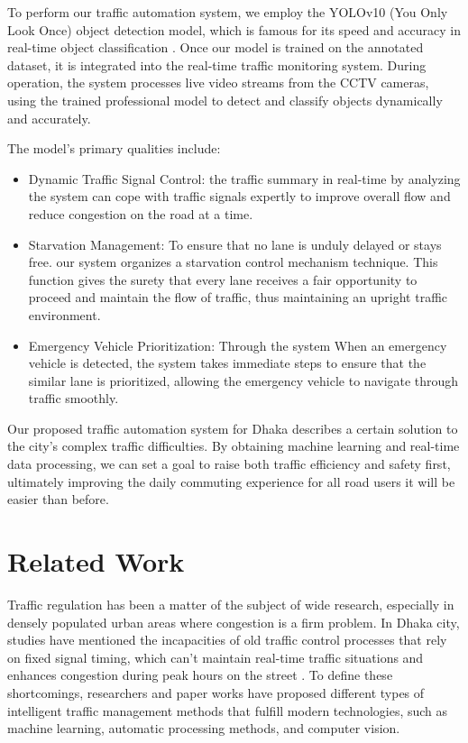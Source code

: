 \documentclass[usenatbib]{tjaa}
\begin{document}
To perform our traffic automation system, we employ the YOLOv10 (You Only Look Once) object detection model, which is famous for its speed and accuracy in real-time object classification \citep{clar:a4}. Once our model is trained on the annotated dataset, it is integrated into the real-time traffic monitoring system. During operation, the system processes live video streams from the CCTV cameras, using the trained professional model to detect and classify objects dynamically and accurately. 


The model's primary qualities include: 
\begin{itemize}
    \item Dynamic Traffic Signal Control: the traffic summary in real-time by analyzing the system can cope with traffic signals expertly to improve overall flow and reduce congestion on the road at a time.
    \item Starvation Management: To ensure that no lane is unduly delayed or stays free. our system organizes a starvation control mechanism technique. This function gives the surety that every lane receives a fair opportunity to proceed and maintain the flow of traffic, thus maintaining an upright traffic environment. 
    \item Emergency Vehicle Prioritization: Through the system When an emergency vehicle is detected, the system takes immediate steps to ensure that the similar lane is prioritized, allowing the emergency vehicle to navigate through traffic smoothly. 
\end{itemize}

 

Our proposed traffic automation system for Dhaka describes a certain solution to the city's complex traffic difficulties. By obtaining machine learning and real-time data processing, we can set a goal to raise both traffic efficiency and safety first, ultimately improving the daily commuting experience for all road users it will be easier than before.

\section[]{Related Work}
Traffic regulation has been a matter of the subject of wide research, especially in densely populated urban areas where congestion is a firm problem. In Dhaka city, studies have mentioned the incapacities of old traffic control processes that rely on fixed signal timing, which can't maintain real-time traffic situations and enhances congestion during peak hours on the street \citep{clar:a5}. To define these shortcomings, researchers and paper works have proposed different types of intelligent traffic management methods that fulfill modern technologies, such as machine learning, automatic processing methods, and computer vision.
\end{document}
